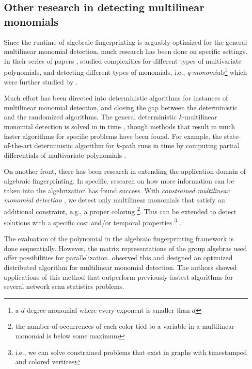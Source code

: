 \subsection{Other research in detecting multilinear monomials}
\label{sect:other_improvements}

Since the runtime of algebraic fingerprinting is arguably optimized for 
the general multilinear monomial detection, much research has been 
done on specific settings. In their series of papers \cite{Chen11a, Chen11b, Chen10, Chen13a}, 
\citeauthor{Chen13a} studied complexities for different types of multivariate polynomials, and
detecting different types of monomials, i.e., 
\emph{q-monomials}\footnote{a $d$-degree monomial where every exponent is smaller than $d$} 
which were further studied by \textcite{Chen14}.

Much effort \cite{Chen13b, Chen13c, Fomin14, Pratt19, Brand19, Brand21, Brand22}  
has been directed into deterministic algorithms for 
instances of multilinear monomial detection, and 
closing the gap between the deterministic and the randomized algorithms. 
The general deterministic $k$-multilinear monomial detection is solved in
in  time \cite{Fomin14}, though methods that result in 
much faster algorithms for specific problems 
have been found. For example, the state-of-the-art deterministic algorithm for $k$-path 
runs in  time by computing partial differentials of multivariate polynomials \cite{Brand21}.

%
On another front, there has been research in 
extending the application domain of algebraic fingerprinting. 
In specific, 
research on how more information can be taken 
into the algebrization has found success. 
With \emph{constrained multilinear monomial detection} \cite{Koutis12, Björklund16}, 
we detect only multilinear monomials that satisfy an additional constraint, 
e.g., a proper coloring
\footnote{the number of occurrences of each color tied to a variable in a multilinear monomial is below some maximum}. 
This can be extended to detect solutions with a specific cost \cite{Björklund16} 
and/or temporal properties
\footnote{i.e., we can solve constrained problems that exist in graphs with timestamped and colored vertices} 
\cite{Thejaswi20}.

The evaluation of the polynomial in the algebraic fingerprinting framework is done sequentially. 
However, the matrix representations of the group algebras used 
offer possibilities for parallelization. \textcite{Midas19} observed this and designed 
an optimized distributed algorithm for multilinear monomial detection. 
The authors showed applications of this method that outperform previously 
fastest algorithms for several network scan statistics problems.

